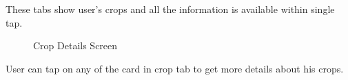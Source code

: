 \documentclass[../Report.tex]{subfiles}
\begin{document}
\noindent These tabs show user's crops and all the information is available within single tap.

\begin{figure}[H]%
    \centering
    \qquad
    \caption{Crop Details Screen}
    \label{fig:ss_crop_details}%
\end{figure}

\noindent User can tap on any of the card in crop tab to get more details about his crops.
\end{document}
